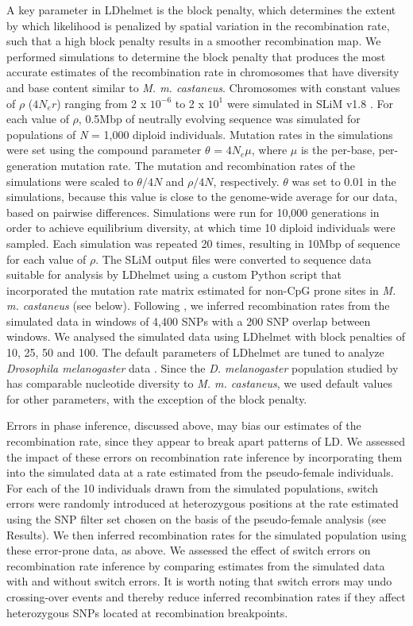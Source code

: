 	A key parameter in LDhelmet is the block penalty, which determines the extent by which likelihood is penalized by spatial variation in the recombination rate, such that a high block penalty results in a smoother recombination map. We performed simulations to determine the block penalty that produces the most accurate estimates of the recombination rate in chromosomes that have diversity and base content similar to \textit{M. m. castaneus}. Chromosomes with constant values of $\rho$ ($4N_er$) ranging from 2 x $10^{-6}$ to 2 x $10^1$ were simulated in SLiM v1.8 \citep{RN148}. For each value of $\rho$, 0.5Mbp of neutrally evolving sequence was simulated for populations of \textit{N} = 1,000 diploid individuals. Mutation rates in the simulations were set using the compound parameter $\theta$ = $4N_e\mu$, where $\mu$ is the per-base, per-generation mutation rate. The mutation and recombination rates of the simulations were scaled to $\theta /4N$ and $\rho /4N$, respectively. $\theta$ was set to 0.01 in the simulations, because this value is close to the genome-wide average for our data, based on pairwise differences. Simulations were run for 10,000 generations in order to achieve equilibrium diversity, at which time 10 diploid individuals were sampled. Each simulation was repeated 20 times, resulting in 10Mbp of sequence for each value of $\rho$. The SLiM output files were converted to sequence data suitable for analysis by LDhelmet using a custom Python script that incorporated the mutation rate matrix estimated for non-CpG prone sites in \textit{M. m. castaneus} (see below). Following \cite{RN213}, we inferred recombination rates from the simulated data in windows of 4,400 SNPs with a 200 SNP overlap between windows. We analysed the simulated data using LDhelmet with block penalties of 10, 25, 50 and 100. The default parameters of LDhelmet are tuned to analyze \textit{Drosophila melanogaster} data \citep{RN213}. Since the \textit{D. melanogaster} population studied by \cite{RN213} has comparable nucleotide diversity to \textit{M. m. castaneus}, we used default values for other parameters, with the exception of the block penalty.
 
	Errors in phase inference, discussed above, may bias our estimates of the recombination rate, since they appear to break apart patterns of LD. We assessed the impact of these errors on recombination rate inference by incorporating them into the simulated data at a rate estimated from the pseudo-female individuals. For each of the 10 individuals drawn from the simulated populations, switch errors were randomly introduced at heterozygous positions at the rate estimated using the SNP filter set chosen on the basis of the pseudo-female analysis (see Results). We then inferred recombination rates for the simulated population using these error-prone data, as above. We assessed the effect of switch errors on recombination rate inference by comparing estimates from the simulated data with and without switch errors. It is worth noting that switch errors may undo crossing-over events and thereby reduce inferred recombination rates if they affect heterozygous SNPs located at recombination breakpoints.

